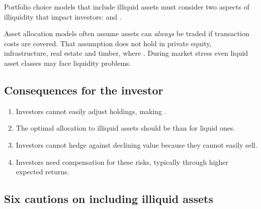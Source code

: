 
Portfolio choice models that include illiquid assets must consider two aspects of
illiquidity that impact investors:  and
.

\begin{imkeybox}[title={Why standard asset allocation breaks}]
Asset allocation models often assume assets can \emph{always} be traded if
transaction costs are covered. That assumption does not hold in private equity,
infrastructure, real estate and timber, where . During market stress even liquid asset classes
may face liquidity problems.
\end{imkeybox}

\subsection{Consequences for the investor}

\begin{enumerate}
\item {} Investors cannot easily adjust holdings, making
.
\item {} The optimal allocation to illiquid assets
should be  than for liquid ones.
\item {} Investors cannot hedge against declining value
because they cannot easily sell.
\item {} Investors need compensation for these
risks, typically through higher expected returns.
\end{enumerate}

\subsection{Six cautions on including illiquid assets}

